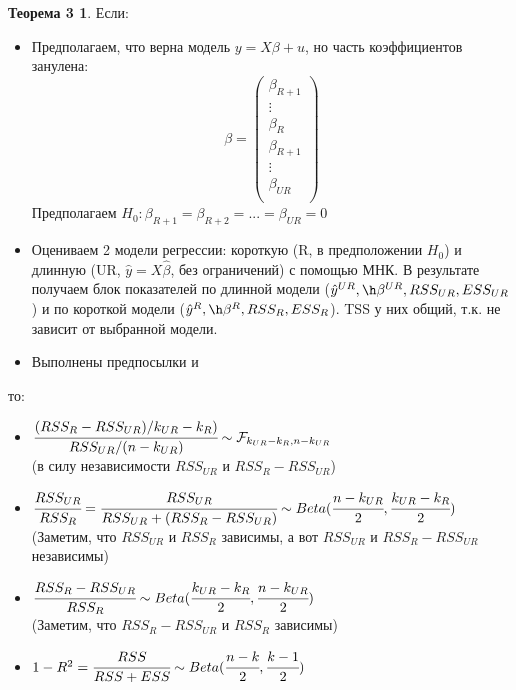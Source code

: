 \documentclass[12pt]{article} %
\theoremstyle{definition} %
\def \hb{\hat{\beta}}
\def \hy{\hat{y}}
\def \cF{\mathcal{F}}
\begin{document}
\newtheorem*{theo_nnn}{Теорема 3}
\begin{theo_nnn}
    
    Если:
    \begin{itemize}
        \item \text{[ТГМ1''] } Предполагаем, что верна модель $y=X\beta+u$, но часть коэффициентов занулена:\\
        \[
            \beta = 
                \begin{pmatrix} 
                    \beta_{R+1}  \\ \vdots \\ \beta_{R} \\ \beta_{R+1}  \\ \vdots \\ \beta_{UR} \\ 
                \end{pmatrix}
        \]
        Предполагаем $H_0: \beta_{R+1} = \beta_{R+2} =...=\beta_{UR}=0$
        \item \text{[ТГМ2''] } Оцениваем 2 модели регрессии: короткую (R, в предположении $H_0$) и длинную (UR, $\hy = X\hb$, без ограничений) с помощью МНК. В результате получаем блок показателей по длинной модели ($\hy^{UR}, \h\beta^{UR}, RSS_{UR}, ESS_{UR}$) и по короткой модели ($\hy^{R}, \h\beta^{R}, RSS_{R}, ESS_{R}$). TSS у них общий, т.к. не зависит от выбранной модели.
        \item Выполнены предпосылки \text{[ТГМ3-5] } и \text{[нормальность] }
    \end{itemize}
    
    то:
    \begin{itemize}
        \item $\cfrac{(RSS_{R} - RSS_{UR})/k_{UR} - k_{R})}{RSS_{UR}/(n-k_{UR})} \sim \cF_{k_{UR} - k_{R}, n-k_{UR}}$ \\
        (в силу независимости $RSS_{UR} \text{ и } RSS_{R} - RSS_{UR}$)
        \item $\cfrac{RSS_{UR}}{RSS_{R}} = \cfrac{RSS_{UR}}{RSS_{UR}+(RSS_{R}-RSS_{UR})} \sim Beta(\cfrac{n-k_{UR}}{2}, \cfrac{k_{UR} - k_{R}}{2})$ \\
        (Заметим, что $RSS_{UR} \text{ и } RSS_{R}$ зависимы, а вот $RSS_{UR} \text{ и } RSS_{R}-RSS_{UR}$ независимы)
        \item $\cfrac{RSS_{R}-RSS_{UR}}{RSS_{R}} \sim Beta(\cfrac{k_{UR} - k_{R}}{2}, \cfrac{n-k_{UR}}{2})$ \\
        (Заметим, что $RSS_{R}-RSS_{UR} \text{ и } RSS_{R}$ зависимы)
        \item $1-R^2 = \cfrac{RSS}{RSS+ESS} \sim Beta(\cfrac{n-k}{2}, \cfrac{k-1}{2})$
    \end{itemize}
    
    
\end{theo_nnn}
\end{document}
